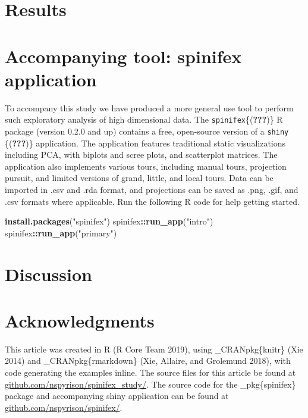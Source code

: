 \documentclass[]{article}
\newenvironment{Shaded}{\begin{snugshade}}{\end{snugshade}}
\newcommand{\KeywordTok}[1]{\textcolor[rgb]{0.13,0.29,0.53}{\textbf{#1}}}
\newcommand{\NormalTok}[1]{#1}
\newcommand{\OperatorTok}[1]{\textcolor[rgb]{0.81,0.36,0.00}{\textbf{#1}}}
\newcommand{\StringTok}[1]{\textcolor[rgb]{0.31,0.60,0.02}{#1}}
\begin{document}
\hypertarget{sec:results}{%
\section{Results}\label{sec:results}}

\hypertarget{sec:spinifex}{%
\section{Accompanying tool: spinifex application}\label{sec:spinifex}}

To accompany this study we have produced a more general use tool to
perform such exploratory analysis of high dimensional data. The
\texttt{spinifex}\{({\textbf{???}})\} R package (version 0.2.0 and up)
contains a free, open-source version of a \texttt{shiny}
\{({\textbf{???}})\} application. The application features traditional
static visualizations including PCA, with biplots and scree plots, and
scatterplot matrices. The application also implements various tours,
including manual tours, projection pursuit, and limited versions of
grand, little, and local tours. Data can be imported in .csv and .rda
format, and projections can be saved as .png, .gif, and .csv formats
where applicable. Run the following R code for help getting started.

\begin{Shaded}
\begin{Highlighting}[]
\KeywordTok{install.packages}\NormalTok{(}\StringTok{"spinifex"}\NormalTok{)}
\NormalTok{spinifex}\OperatorTok{::}\KeywordTok{run_app}\NormalTok{(}\StringTok{"intro"}\NormalTok{)}
\NormalTok{spinifex}\OperatorTok{::}\KeywordTok{run_app}\NormalTok{(}\StringTok{"primary"}\NormalTok{)}
\end{Highlighting}
\end{Shaded}

\hypertarget{sec:discussion}{%
\section{Discussion}\label{sec:discussion}}

\hypertarget{sec:acknowledgments}{%
\section{Acknowledgments}\label{sec:acknowledgments}}

This article was created in R (R Core Team 2019), using
\_CRANpkg\{knitr\} (Xie 2014) and \_CRANpkg\{rmarkdown\} (Xie, Allaire,
and Grolemund 2018), with code generating the examples inline. The
source files for this article be found at
\href{https://github.com/nspyrison/spinifex_paper/}{github.com/nspyrison/spinifex\_study/}.
The source code for the \_pkg\{spinifex\} package and accompanying shiny
application can be found at
\href{https://github.com/nspyrison/spinifex/}{github.com/nspyrison/spinifex/}.
\end{document}
